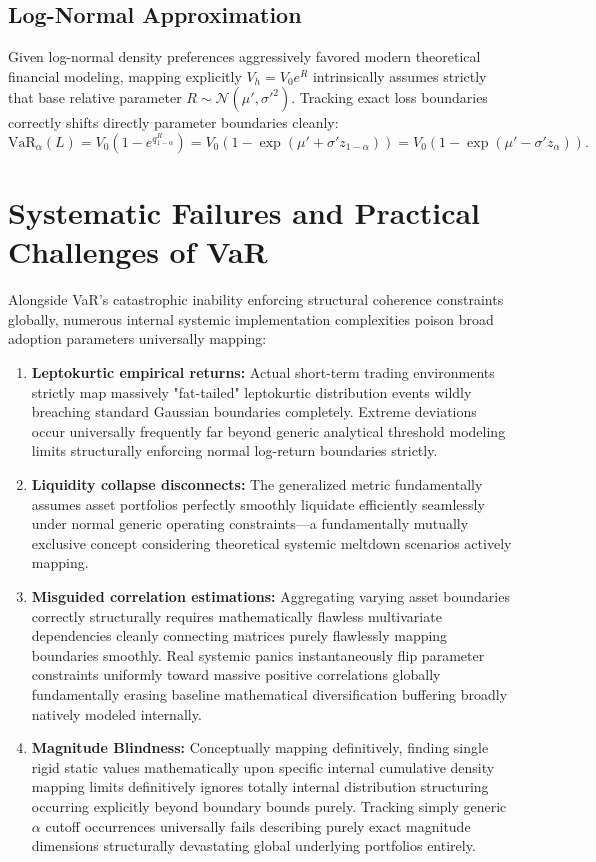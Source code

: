 \subsection{Log-Normal Approximation}

Given log-normal density preferences aggressively favored modern theoretical financial modeling, mapping explicitly $V_h = V_0 e^R$ intrinsically assumes strictly that base relative parameter $R \sim \mathcal{N}(\mu', \sigma'^2)$. Tracking exact loss boundaries correctly shifts directly parameter boundaries cleanly:
$$
\text{VaR}_\alpha(L) = V_0(1 - e^{q_{1-\alpha}^R}) = V_0\left(1 - \exp(\mu' + \sigma' z_{1-\alpha})\right) = V_0\left(1 - \exp(\mu' - \sigma' z_\alpha)\right).
$$

\section{Systematic Failures and Practical Challenges of VaR}

Alongside VaR's catastrophic inability enforcing structural coherence constraints globally, numerous internal systemic implementation complexities poison broad adoption parameters universally mapping:

\begin{enumerate}
    \item \textbf{Leptokurtic empirical returns:} Actual short-term trading environments strictly map massively "fat-tailed" leptokurtic distribution events wildly breaching standard Gaussian boundaries completely. Extreme deviations occur universally frequently far beyond generic analytical threshold modeling limits structurally enforcing normal log-return boundaries strictly.
    \item \textbf{Liquidity collapse disconnects:} The generalized metric fundamentally assumes asset portfolios perfectly smoothly liquidate efficiently seamlessly under normal generic operating constraints—a fundamentally mutually exclusive concept considering theoretical systemic meltdown scenarios actively mapping. 
    \item \textbf{Misguided correlation estimations:} Aggregating varying asset boundaries correctly structurally requires mathematically flawless multivariate dependencies cleanly connecting matrices purely flawlessly mapping boundaries smoothly. Real systemic panics instantaneously flip parameter constraints uniformly toward massive positive correlations globally fundamentally erasing baseline mathematical diversification buffering broadly natively modeled internally.
    \item \textbf{Magnitude Blindness:} Conceptually mapping definitively, finding single rigid static values mathematically upon specific internal cumulative density mapping limits definitively ignores totally internal distribution structuring occurring explicitly beyond boundary bounds purely. Tracking simply generic $\alpha$ cutoff occurrences universally fails describing purely exact magnitude dimensions structurally devastating global underlying portfolios entirely.
\end{enumerate}
